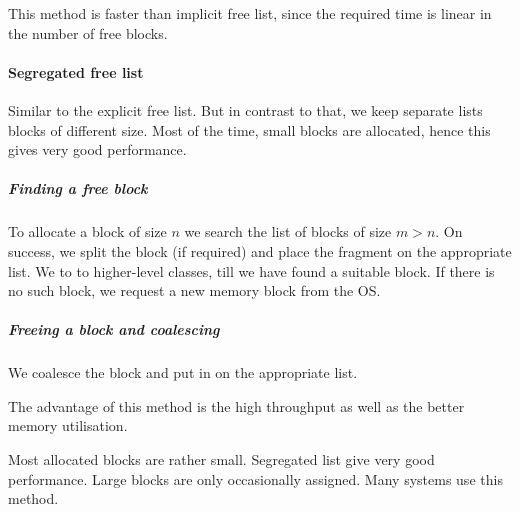 This method is faster than implicit free list, since the required time is linear in the number of free blocks.

\paragraph{Segregated free list}
Similar to the explicit free list. But in contrast to that, we keep separate lists blocks of different size. Most of the time, small blocks are allocated, hence this gives very good performance.

\subparagraph{Finding a free block}
To allocate a block of size $n$ we search the list of blocks of size $m > n$. On success, we split the block (if required) and place the fragment on the appropriate list. We to to higher-level classes, till we have found a suitable block. If there is no such block, we request a new memory block from the OS. 

\subparagraph{Freeing a block and coalescing}
We coalesce the block and put in on the appropriate list.

The advantage of this method is the high throughput as well as the better memory utilisation.

Most allocated blocks are rather small. Segregated list give very good performance. Large blocks are only occasionally assigned. Many systems use this method.
